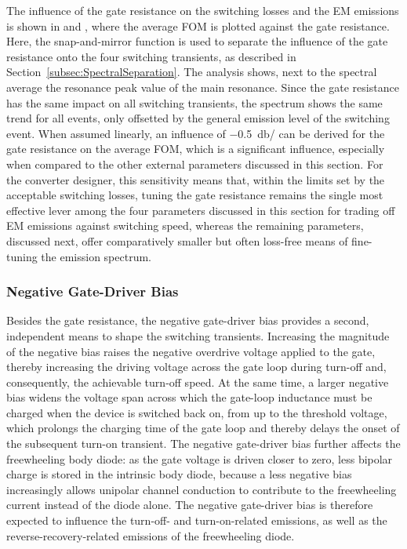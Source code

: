 The influence of the gate resistance on the switching losses and the EM emissions is shown in  and , where the average FOM is plotted against the gate resistance.
Here, the snap-and-mirror function is used to separate the influence of the gate resistance onto the four switching transients, as described in Section~\ref{subsec:SpectralSeparation}.
The analysis shows, next to the spectral average the resonance peak value of the main resonance.
Since the gate resistance has the same impact on all switching transients, the spectrum shows the same trend for all events, only offsetted by the general emission level of the switching event.
When assumed linearly, an influence of \SI{-0.5}{db/\Omega} can be derived for the gate resistance on the average FOM, which is a significant influence, especially when compared to the other external parameters discussed in this section.
For the converter designer, this sensitivity means that, within the limits set by the acceptable switching losses, tuning the gate resistance remains the single most effective lever among the four parameters discussed in this section for trading off EM emissions against switching speed, whereas the remaining parameters, discussed next, offer comparatively smaller but often loss-free means of fine-tuning the emission spectrum.

\FloatBarrier

\subsubsection*{Negative Gate-Driver Bias}

Besides the gate resistance, the negative gate-driver bias  provides a second, independent means to shape the switching transients.
Increasing the magnitude of the negative bias raises the negative overdrive voltage applied to the gate, thereby increasing the driving voltage across the gate loop during turn-off and, consequently, the achievable turn-off speed.
At the same time, a larger negative bias widens the voltage span across which the gate-loop inductance must be charged when the device is switched back on, from  up to the threshold voltage, which prolongs the charging time of the gate loop and thereby delays the onset of the subsequent turn-on transient.
The negative gate-driver bias further affects the freewheeling body diode: as the gate voltage is driven closer to zero, less bipolar charge is stored in the intrinsic body diode, because a less negative bias increasingly allows unipolar channel conduction to contribute to the freewheeling current instead of the diode alone.
The negative gate-driver bias is therefore expected to influence the turn-off- and turn-on-related emissions, as well as the reverse-recovery-related emissions of the freewheeling diode.

